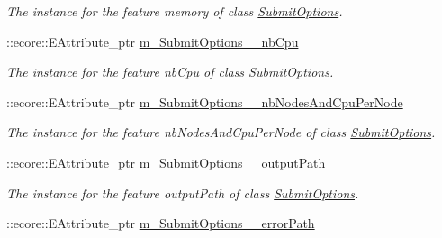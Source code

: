 \begin{DoxyCompactItemize}
\begin{DoxyCompactList}\small\item\em The instance for the feature memory of class \hyperlink{classTMS__Data_1_1SubmitOptions}{SubmitOptions}. \item\end{DoxyCompactList}\item 
\hypertarget{classTMS__Data_1_1TMS__DataPackage_a794de94dd904d305561cfa6946bd25de}{
::ecore::EAttribute\_\-ptr \hyperlink{classTMS__Data_1_1TMS__DataPackage_a794de94dd904d305561cfa6946bd25de}{m\_\-SubmitOptions\_\-\_\-nbCpu}}
\label{classTMS__Data_1_1TMS__DataPackage_a794de94dd904d305561cfa6946bd25de}

\begin{DoxyCompactList}\small\item\em The instance for the feature nbCpu of class \hyperlink{classTMS__Data_1_1SubmitOptions}{SubmitOptions}. \item\end{DoxyCompactList}\item 
\hypertarget{classTMS__Data_1_1TMS__DataPackage_a4aef2221d7a2b72b0978c3084cd17990}{
::ecore::EAttribute\_\-ptr \hyperlink{classTMS__Data_1_1TMS__DataPackage_a4aef2221d7a2b72b0978c3084cd17990}{m\_\-SubmitOptions\_\-\_\-nbNodesAndCpuPerNode}}
\label{classTMS__Data_1_1TMS__DataPackage_a4aef2221d7a2b72b0978c3084cd17990}

\begin{DoxyCompactList}\small\item\em The instance for the feature nbNodesAndCpuPerNode of class \hyperlink{classTMS__Data_1_1SubmitOptions}{SubmitOptions}. \item\end{DoxyCompactList}\item 
\hypertarget{classTMS__Data_1_1TMS__DataPackage_afbf59f70291fa2fc34afac2227b720f4}{
::ecore::EAttribute\_\-ptr \hyperlink{classTMS__Data_1_1TMS__DataPackage_afbf59f70291fa2fc34afac2227b720f4}{m\_\-SubmitOptions\_\-\_\-outputPath}}
\label{classTMS__Data_1_1TMS__DataPackage_afbf59f70291fa2fc34afac2227b720f4}

\begin{DoxyCompactList}\small\item\em The instance for the feature outputPath of class \hyperlink{classTMS__Data_1_1SubmitOptions}{SubmitOptions}. \item\end{DoxyCompactList}\item 
\hypertarget{classTMS__Data_1_1TMS__DataPackage_aaedde41e0fb12f42ece43f19fe542f9f}{
::ecore::EAttribute\_\-ptr \hyperlink{classTMS__Data_1_1TMS__DataPackage_aaedde41e0fb12f42ece43f19fe542f9f}{m\_\-SubmitOptions\_\-\_\-errorPath}}
\label{classTMS__Data_1_1TMS__DataPackage_aaedde41e0fb12f42ece43f19fe542f9f}


\end{DoxyCompactItemize}
